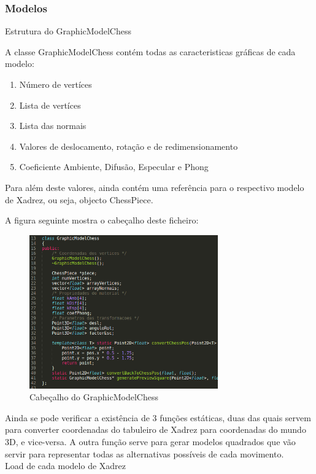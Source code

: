 \documentclass[portugues,final]{revdetua}
\begin{document}
\subsubsection{Modelos}

{\large Estrutura do GraphicModelChess}

A classe GraphicModelChess contém todas as caracteristicas gráficas de cada modelo:
\begin{enumerate}
\item{Número de vertíces}
\item{Lista de vertíces}
\item{Lista das normais}
\item{Valores de deslocamento, rotação e de redimensionamento}
\item{Coeficiente Ambiente, Difusão, Especular e Phong}
\end{enumerate}

Para além deste valores, ainda contém uma referência para o respectivo modelo de Xadrez, ou seja, objecto ChessPiece.

A figura seguinte mostra o cabeçalho deste ficheiro:

\begin{figure}[H]
\centerline{\includegraphics[width=230pt]{images/graphicmodelchess.png}}
\caption{Cabeçalho do GraphicModelChess}
\label{img:complete}
\end{figure}

Ainda se pode verificar a existência de 3 funções estáticas, duas das quais servem para converter coordenadas do tabuleiro de Xadrez para coordenadas do mundo 3D, e vice-versa. A outra função serve para gerar modelos quadrados que vão servir para representar todas as alternativas possíveis de cada movimento.\\

{\large Load de cada modelo de Xadrez}\\
\end{document}
